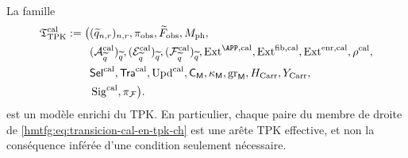 \begin{proposition}
\label{hmtfg:prop:modelo-tpk-calibrado-ch}
La famille
\[
\begin{aligned}
 \mathfrak T_{\rm TPK}^{\rm cal}:=\bigl(
 &(\widetilde q_{n,r})_{n,r},\pi_{\rm obs},
   \widetilde F_{\rm obs},M_{\rm ph},\\
 &(\mathcal A_{\widetilde q}^{\rm cal})_{\widetilde q},
   (\mathcal E_{\widetilde q}^{\rm cal})_{\widetilde q},
   (\mathcal F_{\widetilde q}^{\rm cal})_{\widetilde q},
   \operatorname{Ext}^{\APP,\rm cal},
   \operatorname{Ext}^{\rm fib,cal},
   \operatorname{Ext}^{\rm enr,cal},\rho^{\rm cal},\\
 &\mathsf{Sel}^{\rm cal},\mathsf{Tra}^{\rm cal},
   \operatorname{Upd}^{\rm cal},\mathsf C_{\mathsf M},
   \kappa_{\mathsf M},\operatorname{gr}_{\mathsf M},
   H_{\rm Carr},Y_{\rm Carr},\\
 &\operatorname{Sig}^{\rm cal},\pi_{\mathcal F}\bigr).
\end{aligned}
\]
est un modèle enrichi du TPK. En particulier, chaque paire du membre de droite de \eqref{hmtfg:eq:transicion-cal-en-tpk-ch} est une arête TPK effective, et non la conséquence inférée d'une condition seulement nécessaire.
\end{proposition}

